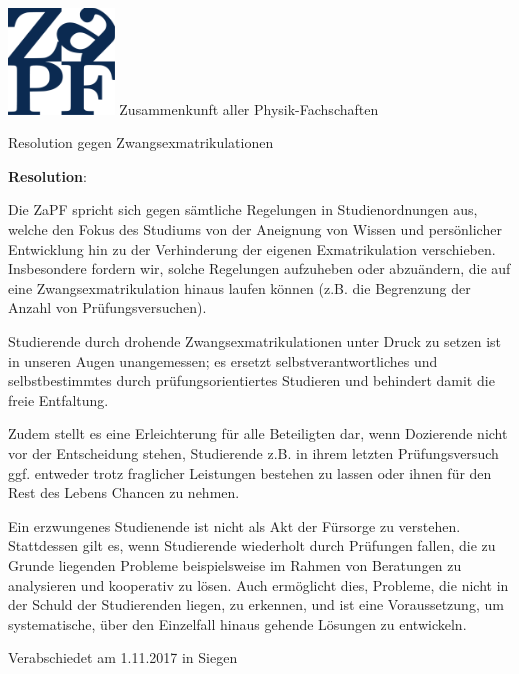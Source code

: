 \documentclass[DIV=calc]{scrartcl}
\begin{document}
    \hspace{0.87\textwidth}
    \begin{minipage}{120pt}
        \vspace{-1.8cm}
        \includegraphics[width=80pt]{../../logo.pdf}
        \centering
        \small Zusammenkunft aller Physik-Fachschaften
    \end{minipage}
    \begin{center}
        \huge{Resolution gegen Zwangsexmatrikulationen}\vspace{.25\baselineskip}\\
        \normalsize
    \end{center}
    \vspace{1cm} 
    
\textbf{Resolution}: 
       
Die ZaPF spricht sich gegen sämtliche Regelungen in Studienordnungen aus, welche den Fokus des Studiums von der Aneignung von Wissen und persönlicher Entwicklung hin zu der Verhinderung der eigenen Exmatrikulation verschieben. Insbesondere fordern wir, solche Regelungen aufzuheben oder abzuändern,  die auf eine Zwangsexmatrikulation hinaus laufen können (z.B. die Begrenzung der Anzahl von Prüfungsversuchen).

Studierende durch drohende Zwangsexmatrikulationen unter Druck zu setzen ist in unseren Augen unangemessen; es ersetzt selbstverantwortliches und selbstbestimmtes durch prüfungsorientiertes Studieren  und behindert damit die freie Entfaltung.

Zudem stellt es eine Erleichterung für alle Beteiligten dar, wenn Dozierende nicht vor der Entscheidung stehen, Studierende z.B. in ihrem letzten Prüfungsversuch ggf. entweder trotz fraglicher Leistungen bestehen zu lassen oder ihnen für den Rest des Lebens Chancen zu nehmen.

Ein erzwungenes Studienende ist nicht als Akt der Fürsorge zu verstehen. Stattdessen gilt es, wenn
Studierende wiederholt durch Prüfungen fallen, die zu Grunde liegenden Probleme beispielsweise im Rahmen von Beratungen zu analysieren und kooperativ zu lösen. Auch ermöglicht dies, Probleme, die nicht in der Schuld der Studierenden liegen, zu erkennen, und ist eine Voraussetzung, um systematische, über den Einzelfall hinaus gehende Lösungen zu entwickeln.
\vspace{-0.5\baselineskip}
    \begin{flushright}
        Verabschiedet am 1.11.2017 in Siegen
    \end{flushright}
\end{document}
